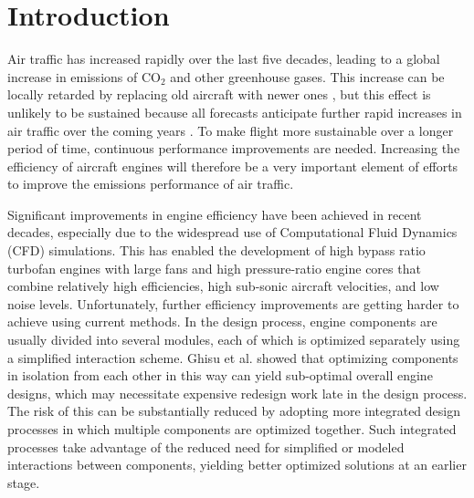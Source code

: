 
\chapter{Introduction} \label{ch:Intro}
Air traffic has increased rapidly over the last five decades, leading to a global increase in emissions of CO$_2$ and other greenhouse gases. This increase can be locally retarded by replacing old aircraft with newer ones \cite{emission}, but this effect is unlikely to be sustained because all forecasts anticipate further rapid increases in air traffic over the coming years \cite{airbus,jadc}. To make flight more sustainable over a longer period of time, continuous performance improvements are needed. Increasing the efficiency of aircraft engines will therefore be a very important element of efforts to improve the emissions performance of air traffic.

Significant improvements in engine efficiency have been achieved in recent decades, especially due to the widespread use of Computational Fluid Dynamics (CFD) simulations. This has enabled the development of high bypass ratio turbofan engines with large fans and high pressure-ratio engine cores that combine relatively high efficiencies, high sub-sonic aircraft velocities, and low noise levels. Unfortunately, further efficiency improvements are getting harder to achieve using current methods. In the design process, engine components are usually divided into several modules, each of which is optimized separately using a simplified interaction scheme. Ghisu et al.\cite{IntegrP2} showed that optimizing components in isolation from each other in this way can yield sub-optimal overall engine designs, which may necessitate expensive redesign work late in the design process. The risk of this can be substantially reduced by adopting more integrated design processes in which multiple components are optimized together. Such integrated processes take advantage of the reduced need for simplified or modeled interactions between components, yielding better optimized solutions at an earlier stage\cite{IntegrP1,IntegrP2}.

